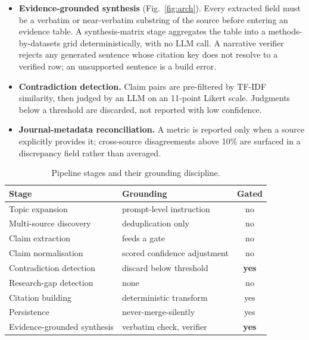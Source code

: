 \documentclass[conference]{IEEEtran}
\begin{document}
\begin{itemize}
\item \textbf{Evidence-grounded synthesis} (Fig.~\ref{fig:arch}). Every extracted
field must be a verbatim or near-verbatim substring of the source before
entering an evidence table. A synthesis-matrix stage aggregates the table into a
methods-by-datasets grid deterministically, with no LLM call. A narrative
verifier rejects any generated sentence whose citation key does not resolve to a
verified row; an unsupported sentence is a build error.
\item \textbf{Contradiction detection.} Claim pairs are pre-filtered by TF-IDF
similarity, then judged by an LLM on an 11-point Likert scale. Judgments below a
threshold are discarded, not reported with low confidence.
\item \textbf{Journal-metadata reconciliation.} A metric is reported only when a
source explicitly provides it; cross-source disagreements above 10\% are surfaced
in a discrepancy field rather than averaged.
\end{itemize}

\begin{table}[t]
\centering
\caption{Pipeline stages and their grounding discipline.}
\label{tab:stages}
\begin{tabular}{@{}llc@{}}
\toprule
Stage & Grounding & Gated \\
\midrule
Topic expansion & prompt-level instruction & no \\
Multi-source discovery & deduplication only & no \\
Claim extraction & feeds a gate & no \\
Claim normalisation & scored confidence adjustment & no \\
Contradiction detection & discard below threshold & \textbf{yes} \\
Research-gap detection & none & no \\
Citation building & deterministic transform & yes \\
Persistence & never-merge-silently & yes \\
Evidence-grounded synthesis & verbatim check, verifier & \textbf{yes} \\
\bottomrule
\end{tabular}
\end{table}
\end{document}
